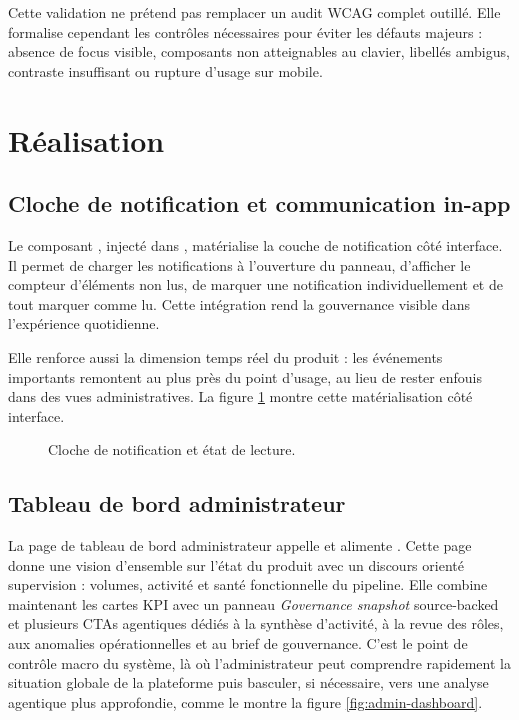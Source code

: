 Cette validation ne prétend pas remplacer un audit WCAG complet outillé. Elle formalise cependant les contrôles nécessaires pour éviter les défauts majeurs : absence de focus visible, composants non atteignables au clavier, libellés ambigus, contraste insuffisant ou rupture d'usage sur mobile.


\section{Réalisation}

\subsection{Cloche de notification et communication in-app}
Le composant , injecté dans , matérialise la couche de notification côté interface. Il permet de charger les notifications à l'ouverture du panneau, d'afficher le compteur d'éléments non lus, de marquer une notification individuellement et de tout marquer comme lu. Cette intégration rend la gouvernance visible dans l'expérience quotidienne.

Elle renforce aussi la dimension temps réel du produit : les événements importants remontent au plus près du point d'usage, au lieu de rester enfouis dans des vues administratives. La figure \ref{fig:notification-bell} montre cette matérialisation côté interface.

\begin{figure}[H]
  \centering
  \caption{\label{fig:notification-bell}Cloche de notification et état de lecture.}
\end{figure}

\subsection{Tableau de bord administrateur}
La page de tableau de bord administrateur appelle  et alimente . Cette page donne une vision d'ensemble sur l'état du produit avec un discours orienté supervision : volumes, activité et santé fonctionnelle du pipeline.
Elle combine maintenant les cartes KPI avec un panneau \textit{Governance snapshot} source-backed et plusieurs CTAs agentiques dédiés à la synthèse d'activité, à la revue des rôles, aux anomalies opérationnelles et au brief de gouvernance.
C'est le point de contrôle macro du système, là où l'administrateur peut comprendre rapidement la situation globale de la plateforme puis basculer, si nécessaire, vers une analyse agentique plus approfondie, comme le montre la figure \ref{fig:admin-dashboard}.

